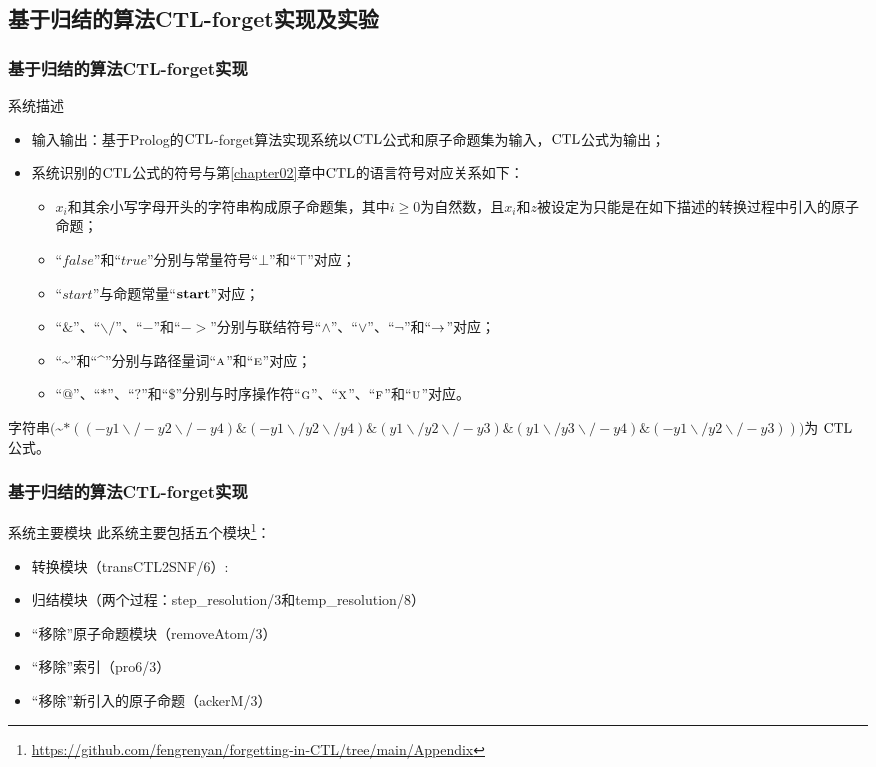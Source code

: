 \documentclass[9pt, CJK]{beamer}
\begin{document}
\subsection{基于归结的算法CTL-forget实现及实验}
\begin{frame}
	\frametitle{基于归结的算法CTL-forget实现}
	{\footnotesize
		\begin{block}{系统描述}
			\begin{itemize}
				\item 输入输出：基于Prolog的$\textrm{CTL}$-forget算法实现系统以$\textrm{CTL}$公式和原子命题集为输入，$\textrm{CTL}$公式为输出；
				\item 系统识别的$\textrm{CTL}$公式的符号与第\ref{chapter02}章中$\textrm{CTL}$的语言符号对应关系如下：
				\begin{itemize}
					\item $x_i$和其余小写字母开头的字符串构成原子命题集，其中$i\geq 0$为自然数，且$x_i$和$z$被设定为只能是在如下描述的转换过程中引入的原子命题；%
					\item “$false$”和“$true$”分别与常量符号“$\bot$”和“$\top$”对应；
					\item “$start$”与命题常量“$\textbf{start}$”对应；
					\item “$\&$”、“$\backslash/$”、“$-$”和“$->$”分别与联结符号“$\wedge$”、“$\vee$”、“$\neg$”和“$\rightarrow$”对应；%
					\item “\textasciitilde”和“\textasciicircum”分别与路径量词“$\textsc{a}$”和“$\textsc{e}$”对应；
					\item “$@$”、“$*$”、“$?$”和“$\$$”分别与时序操作符“$\textsc{g}$”、“$\textsc{x}$”、“$\textsc{f}$”和“$\textsc{u}$”对应。
				\end{itemize}
			\end{itemize}
		\end{block}
	
	\begin{example}
		字符串$($\textasciitilde $* ((-y1\backslash/ -y2\backslash/ -y4)\& (-y1\backslash/y2\backslash/y4)\& (y1\backslash/y2\backslash/ -y3)\& (y1\backslash/y3\backslash/ -y4)\& (-y1\backslash/y2\backslash/ -y3)))$为 $\textrm{CTL}$ 公式。
	\end{example}
	}
\end{frame}

\begin{frame}
	\frametitle{基于归结的算法CTL-forget实现}
	{\footnotesize
		\begin{block}{系统主要模块}
			此系统主要包括五个模块\footnote{ \url{https://github.com/fengrenyan/forgetting-in-CTL/tree/main/Appendix}}：
			\begin{itemize}
				\item 转换模块（transCTL2SNF/6）: 
				\item 归结模块（两个过程：step\_resolution/3和temp\_resolution/8）
				\item “移除”原子命题模块（removeAtom/3）
				\item “移除”索引（pro6/3）
				\item “移除”新引入的原子命题（ackerM/3）
			\end{itemize} 
		\end{block}
	}
\end{frame}
\end{document}
